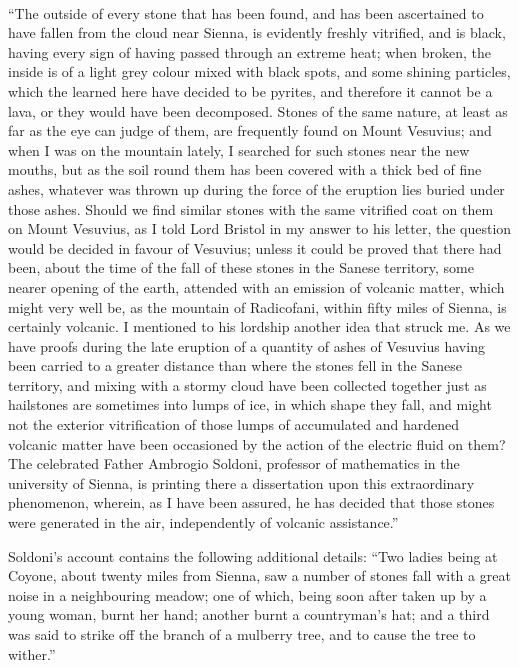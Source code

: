 \documentclass[a4paper, 11pt, oneside]{article}
\begin{document}
\paragraph{}
``The outside of every stone that has been found, and has been ascertained to have fallen from the cloud near Sienna, is evidently freshly vitrified, and is black, having every sign of having passed through an extreme heat; when broken, the inside is of a light grey colour mixed with black spots, and some shining particles, which the learned here have decided to be pyrites, and therefore it cannot be a lava, or they would have been decomposed. Stones of the same nature, at least as far as the eye can judge of them, are frequently found on Mount Vesuvius; and when I was on the mountain lately, I searched for such stones near the new mouths, but as the soil round them has been covered with a thick bed of fine ashes, whatever was thrown up during the force of the eruption lies buried under those ashes. Should we find similar stones with the same vitrified coat on them on Mount Vesuvius, as I told Lord Bristol in my answer to his letter, the question would be decided in favour of Vesuvius; unless it could be proved that there had been, about the time of the fall of these stones in the Sanese territory, some nearer opening of the earth, attended with an emission of volcanic matter, which might very well be, as the mountain of Radicofani, within fifty miles of Sienna, is certainly volcanic. I mentioned to his lordship another idea that struck me. As we have proofs during the late eruption of a quantity of ashes of Vesuvius having been carried to a greater distance than where the stones fell in the Sanese territory, and mixing with a stormy cloud have been collected together just as hailstones are sometimes into lumps of ice, in which shape they fall, and might not the exterior vitrification of those lumps of accumulated and hardened volcanic matter have been occasioned by the action of the electric fluid on them? The celebrated Father Ambrogio Soldoni, professor of mathematics in the university of Sienna, is printing there a dissertation upon this extraordinary phenomenon, wherein, as I have been assured, he has decided that those stones were generated in the air, independently of volcanic assistance.'' 

Soldoni's account contains the following additional details: ``Two ladies being at Coyone, about twenty miles from Sienna, saw a number of stones fall with a great noise in a neighbouring meadow; one of which, being soon after taken up by a young woman, burnt her hand; another burnt a countryman's hat; and a third was said to strike off the branch of a mulberry tree, and to cause the tree to wither.''
\end{document}
